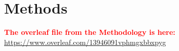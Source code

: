 \chapter{Methods}
\textcolor{red}{\textbf{The overleaf file from the Methodology is here:} \\ \url{https://www.overleaf.com/13946091vphmgxbbxpyg}}







